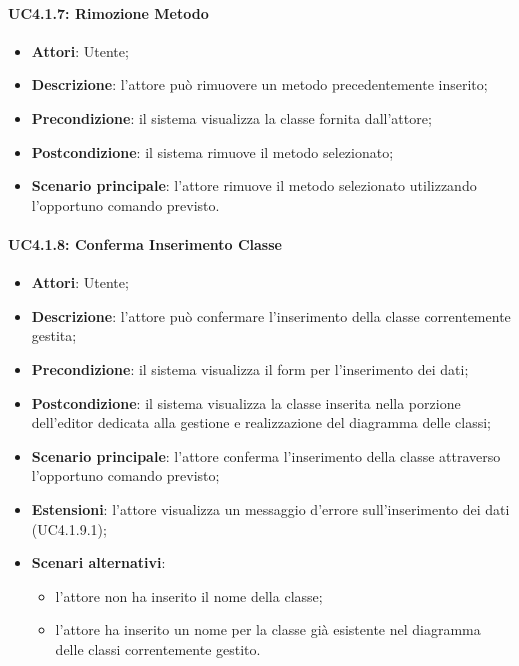 \begin{itemize}
\begin{itemize}
\begin{itemize}
\begin{itemize}
\paragraph{UC4.1.7: Rimozione Metodo}
\label{UC4.1.7}
\begin{itemize}
	\item \textbf{Attori}: Utente;
	\item \textbf{Descrizione}: l'attore può rimuovere un metodo precedentemente inserito;
	\item \textbf{Precondizione}: il sistema visualizza la classe fornita dall'attore;
	\item \textbf{Postcondizione}: il sistema rimuove il metodo selezionato;
	\item \textbf{Scenario principale}: l'attore rimuove il metodo selezionato utilizzando l'opportuno comando previsto.
\end{itemize}

\paragraph{UC4.1.8: Conferma Inserimento Classe}
\label{UC4.1.8}
\begin{itemize}
	\item \textbf{Attori}: Utente;
	\item \textbf{Descrizione}: l'attore può confermare l'inserimento della classe correntemente gestita;
	\item \textbf{Precondizione}: il sistema visualizza il form per l'inserimento dei dati;
	\item \textbf{Postcondizione}: il sistema visualizza la classe inserita nella porzione dell'editor dedicata alla gestione e realizzazione del diagramma delle classi;
	\item \textbf{Scenario principale}: l'attore conferma l'inserimento della classe attraverso l'opportuno comando previsto;
	\item \textbf{Estensioni}: l'attore visualizza un messaggio d'errore sull'inserimento dei dati (UC4.1.9.1);
	\item \textbf{Scenari alternativi}:
	\begin{itemize}
		\item l'attore non ha inserito il nome della classe;
		\item l'attore ha inserito un nome per la classe già esistente nel diagramma delle classi correntemente gestito.
	\end{itemize}
\end{itemize}


\end{itemize}
\end{itemize}
\end{itemize}
\end{itemize}

